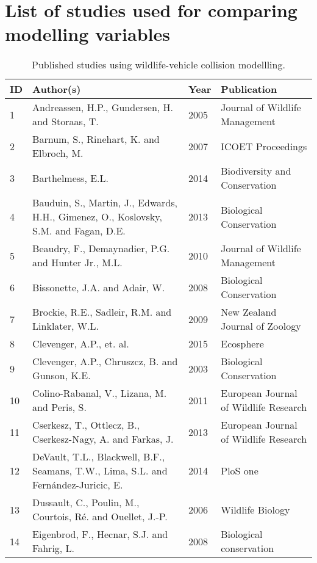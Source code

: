 \chapter{List of studies used for comparing modelling variables}\label{apx:D}
\newpage

\renewcommand\baselinestretch{0.9}\selectfont
\setlength{\extrarowheight}{.5em}
\scriptsize

\begin{longtable}[c]{p{.75cm}p{6cm}p{1.25cm}p{5.5cm}}
\caption[Published studies using wildlife-vehicle collision modellling.]{Published studies using wildlife-vehicle collision modellling.}
\label{coll_studies}\\
\toprule
ID & Author(s) & Year & Publication \\ 
  \hline
  \endhead
  1 & Andreassen, H.P., Gundersen, H. and Storaas, T. & 2005 & Journal of Wildlife Management \\ 
    2 & Barnum, S., Rinehart, K. and Elbroch, M. & 2007 & ICOET Proceedings \\ 
    3 & Barthelmess, E.L. & 2014 & Biodiversity and Conservation \\ 
    4 & Bauduin, S., Martin, J., Edwards, H.H., Gimenez, O., Koslovsky, S.M. and Fagan, D.E. & 2013 & Biological Conservation  \\ 
    5 & Beaudry, F., Demaynadier, P.G. and Hunter Jr., M.L. & 2010 & Journal of Wildlife Management \\ 
    6 & Bissonette, J.A. and Adair, W. & 2008 & Biological Conservation \\ 
    7 & Brockie, R.E., Sadleir, R.M. and Linklater, W.L. & 2009 & New Zealand Journal of Zoology \\ 
    8 & Clevenger, A.P., et. al. & 2015 & Ecosphere \\ 
    9 & Clevenger, A.P., Chruszcz, B. and Gunson, K.E. & 2003 & Biological Conservation  \\ 
   10 & Colino-Rabanal, V., Lizana, M. and Peris, S. & 2011 & European Journal of Wildlife Research \\ 
   11 & Cserkesz, T., Ottlecz, B., Cserkesz-Nagy, A. and Farkas, J. & 2013 & European Journal of Wildlife Research \\ 
   12 & DeVault, T.L., Blackwell, B.F., Seamans, T.W., Lima, S.L. and Fernández-Juricic, E. & 2014 & PloS one \\ 
   13 & Dussault, C., Poulin, M., Courtois, Ré. and Ouellet, J.-P. & 2006 & Wildlife Biology \\ 
   14 & Eigenbrod, F., Hecnar, S.J. and Fahrig, L. & 2008 & Biological conservation \\ 

\end{longtable}
